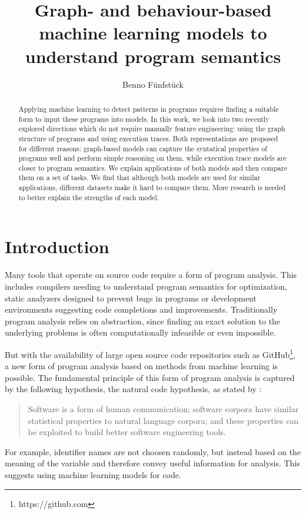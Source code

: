 \documentclass[sigconf,authordraft=true,nonacm=true]{acmart}
\begin{document}
\title{Graph- and behaviour-based machine learning models to understand program semantics}
\author{Benno Fünfstück}

\begin{abstract}
  Applying machine learning to detect patterns in programs requires finding a suitable form to input these programs into models.
  In this work, we look into two recently explored directions which do not require manually feature engineering: using the graph structure of programs and using execution traces.
  Both representations are proposed for different reasons: graph-based models can capture the syntatical properties of programs well and perform simple reasoning on them, while execution trace models are closer to program semantics.
  We explain applications of both models and then compare them on a set of tasks.
  We find that although both models are used for similar applications, different datasets make it hard to compare them.
  More research is needed to better explain the strengths of each model.
\end{abstract}

\maketitle

\section{Introduction}
Many tools that operate on source code require a form of program analysis.
This includes compilers needing to understand program semantics for optimization,
static analyzers designed to prevent bugs in programs
or development environments suggesting code completions and improvements.
Traditionally program analysis relies on abstraction, since finding an exact solution to the underlying problems is often computationally infeasible or even impossible.

But with the availability of large open source code repositories such as GitHub\footnote{https://github.com}, a new form of program analysis based on methods from machine learning is possible.
The fundamental principle of this form of program analysis is captured by the following hypothesis, the natural code hypothesis, as stated by \citet{allamanis_survey_2018}:
\begin{quote}
Software is a form of human communication;
software corpora have similar statistical properties to natural language corpora;
and these properties can be exploited to build better software engineering tools.
\end{quote}
For example, identifier names are not choosen randomly, but instead based on the meaning of the variable and therefore convey useful information for analysis.
This suggests using machine learning models for code.
\end{document}

